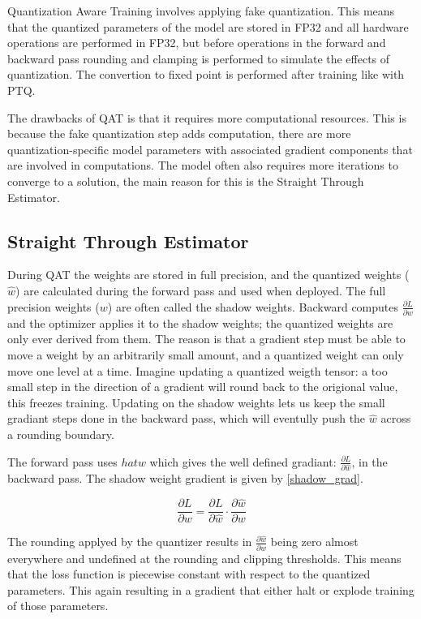 Quantization Aware Training involves applying fake quantization. This means that the quantized parameters of the model
are stored in FP32 and all hardware operations are performed in FP32, but before operations in the forward and backward pass rounding and clamping 
is performed to simulate the effects of quantization. The convertion to fixed point is performed after training like with PTQ.

The drawbacks of QAT is that it requires more computational resources. This is because the fake quantization step adds computation,
there are more quantization-specific model parameters with associated gradient components that are involved in computations.
The model often also requires more iterations to converge to a solution, the main reason for this is the Straight Through Estimator.

\subsection{Straight Through Estimator}

During QAT the weights are stored in full precision, and the quantized weights ($\hat{w}$) are calculated during the forward pass and used when deployed.
The full precision weights ($w$) are often called the shadow weights. 
Backward computes $\frac{\partial L}{\partial w}$ and the optimizer applies it to the shadow weights; the quantized weights are only ever derived from them. 
The reason is that a gradient step must be able to move a weight by an arbitrarily small amount, and a quantized weight can only move one level at a time.
Imagine updating a quantized weigth tensor: a too small step in the direction of a gradient will round back to the origional value, this freezes training.
Updating on the shadow weights lets us keep the small gradiant steps done in the backward pass, which will eventully push the $\hat{w}$ across a rounding boundary.

The forward pass uses $hat{w}$ which gives the well defined gradiant: $\frac{\partial L}{\partial \hat{w}}$, in the backward pass.
The shadow weight gradient is given by \eqref{shadow_grad}.

\begin{equation} \label{shadow_grad}
    \frac{\partial L}{\partial w} = \frac{\partial L}{\partial \hat{w}} \cdot \frac{\partial \hat{w}}{\partial w} 
\end{equation}


The rounding applyed by the quantizer results in $\frac{\partial \hat{w}}{\partial w}$ being zero almost everywhere and undefined at the rounding and clipping thresholds.
This means that the loss function is piecewise constant with respect to the quantized parameters. This again resulting in a gradient that either halt or explode training of those parameters.

